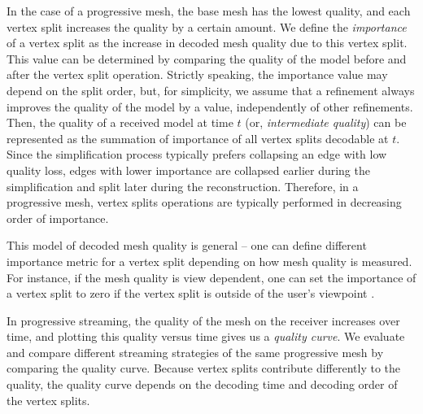     In the case of a progressive mesh, the base mesh has the
    lowest quality, and each vertex split increases the
    quality by a certain amount. We define the \textit{importance} of
    a vertex split as the  increase in decoded mesh
    quality due to this vertex split.  
    This value can be determined by comparing the quality
    of the model before and after the vertex split operation.
    Strictly speaking, the importance value may depend on the split order,
    but, for simplicity, we assume that a refinement
    always improves the quality of the model by a value,
    independently of other refinements.  Then, the quality of a
    received model at time $t$ (or, \textit{intermediate
    quality}) can be represented as the summation of
    importance of all vertex splits decodable at $t$.
    Since the simplification process typically prefers collapsing an edge with low
    quality loss, edges with lower importance are collapsed earlier during the
    simplification and split later during the reconstruction.  Therefore, in 
    a progressive mesh, vertex splits operations are typically performed in 
    decreasing order of importance.

    This model of decoded mesh quality is general -- one can
    define different importance metric for a vertex split depending
    on how mesh quality is measured.
    For instance, if the mesh quality is view dependent, one
    can set the importance of a vertex split to zero if the vertex
    split is outside of the user's viewpoint \cite{258843}. 


    In progressive streaming, the quality of the mesh on the receiver
    increases over time, and plotting this quality versus time gives us
    a \emph{quality curve}.  
    We evaluate and compare different streaming strategies 
    of the same progressive mesh by comparing the quality curve.
    Because vertex splits contribute differently
    to the quality, the quality curve depends on the decoding time and decoding order
    of the vertex splits. %
 

